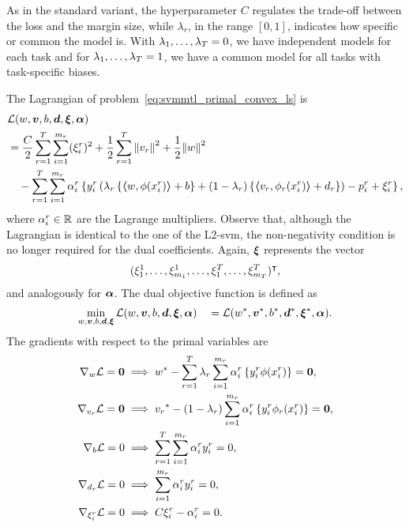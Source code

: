 As in the standard variant, the hyperparameter $C$ regulates the trade-off between the loss and the margin size, while $\lambda_r$, in the range $[0, 1]$, indicates how specific or common the model is. With $\lambda_1, \ldots, \lambda_T=0$, we have independent models for each task and for $\lambda_1, \ldots, \lambda_T=1$, we have a common model for all tasks with task-specific biases. 
 


The Lagrangian of problem~\eqref{eq:svmmtl_primal_convex_ls} is
\begin{equation}\label{eq:svmmtl_lagrangian_convex_ls}
    \begin{aligned}
        & \lagr({w}, \fv{v}, b, \fv{d}, \fv{\xi}, \fv{\alpha}) \\
        &=  \frac{C}{2} \sum_{r= 1}^T \sum_{i=1}^{m_r} ({\xi_{i}^r})^2 + \frac{1}{2} \sum_{r= 1}^T{\norm{{v}_r}^2} + \frac{1}{2} {\norm{{w}}}^2 \\
        &\quad -  \sum_{r= 1}^T \sum_{i=1}^{m_r} \alpha_i^r \left\lbrace y_{i}^r  \left(\lambda_r \left\lbrace \dotp{w}{\phi(x_{i}^r)} + b  \right\rbrace + (1 - \lambda_r) \left\lbrace \dotp{{v}_r}{\phi_r(x_{i}^r)} + d_r \right\rbrace  \right) - p_{i}^r + \xi_{i}^r  \right\rbrace ,
    \end{aligned}
\end{equation}
where $\alpha_i^r \in \mathbb{R}$ are the Lagrange multipliers. Observe that, although the Lagrangian is identical to the one of the L2-\acrshort{svm}, the non-negativity condition is no longer required for the dual coefficients.  Again, $\bm{\xi}$ represents the vector $$(\xi_1^1, \ldots, \xi_{m_1}^1, \ldots, \xi_1^T, \ldots, \xi_{m_T}^T)^\intercal,$$ and analogously for $\bm{\alpha}$. The dual objective function is defined as 
\begin{equation}\nonumber
    \begin{aligned}
          \min_{{w}, \bm{v}, b, \bm{d}, \bm{\xi}} \mathcal{L}({w}, \bm{v}, b, \bm{d}, \bm{\xi}, \bm{\alpha})
         \quad = \mathcal{L}({{w}}^*, {\bm{v}}^*, {b}^*, {\bm{d}}^*, {\bm{\xi}}^*, \bm{\alpha}) .
    \end{aligned}    
\end{equation}
The gradients with respect to the primal variables are
\begin{align}
    \grad_{{w}} \lagr = \fv{0}  &\implies \optim{{w}} - \sum_{r= 1}^\ntasks \lambda_r \sum_{i=1}^{m_r} {\alpha_i^r} \left\lbrace y_i^r \phi(x_i^r) \right\rbrace = \fv{0} , \label{eq:common_repr_conv_ls} \\
    \grad_{{v}_r} \lagr = \fv{0} &\implies \optim{{v}_r} - (1 - \lambda_r) \sum_{i=1}^{m_r} {\alpha_i^r} \left\lbrace y_i^r \phi_r(x_i^r) \right\rbrace = \fv{0} , \label{eq:specific_repr_conv_ls} \\
    \grad_{b} \lagr = 0  &\implies \sum_{r= 1}^T \sum_{i=1}^{m_r} {\alpha_i^r} y_i^r = 0 , \label{eq:specific_eqconstr_conv_ls}  \\
    \grad_{{d}_r} \lagr = 0 &\implies \sum_{i=1}^{m_r} {\alpha_i^r} y_i^r = 0 , \label{eq:common_eqconstr_conv_ls} \\
    \grad_{\xi_i^r} \lagr = 0 &\implies C \xi_i^r - {\alpha_i^r} = 0 . \label{eq:xi_feas_conv_ls}
\end{align}
